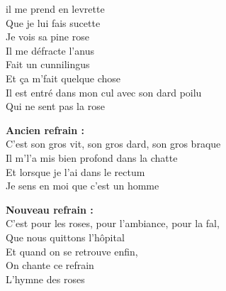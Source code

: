 \vspace{-0.5cm}
 il me prend en levrette
\\Que je lui fais sucette
\\Je vois sa pine rose
\\Il me défracte l'anus
\\Fait un cunnilingus
\\Et ça m'fait quelque chose
\\Il est entré dans mon cul avec son dard poilu
\\Qui ne sent pas la rose\\
\begin{minipage}[t]{.55\textwidth}
    \kern0pt
    \textbf{Ancien refrain :}
    \\C'est son gros vit, son gros dard, son gros braque
    \\Il m'l'a mis bien profond dans la chatte
    \\Et lorsque je l'ai dans le rectum
    \\Je sens en moi que c'est un homme
\end{minipage}
\hfill
\hspace{0.5cm}
\begin{minipage}[t]{.45\textwidth}
    \kern0pt
    \textbf{Nouveau refrain :}
    \\C'est pour les roses, pour l'ambiance, pour la fal, 
    \\Que nous quittons l'hôpital 
    \\Et quand on se retrouve enfin, 
    \\On chante ce refrain 
    \\L'hymne des roses\\
\end{minipage}


